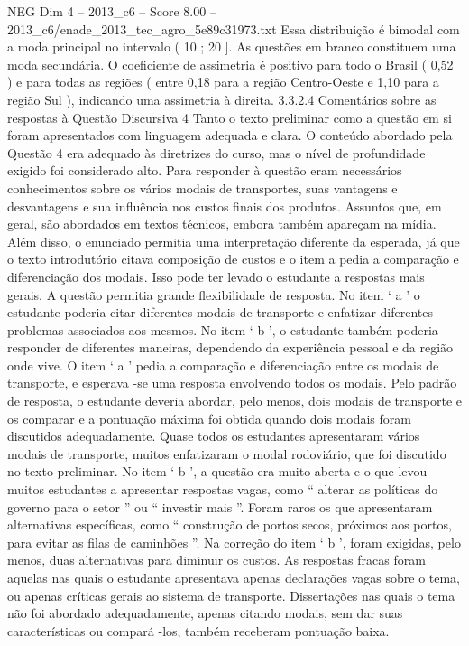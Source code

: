 \begin{textsample}{NEG Dim 4 – 2013\_c6 – Score 8.00 – 2013\_c6/enade\_2013\_tec\_agro\_5e89c31973.txt}
Essa distribuição é bimodal com a moda principal no intervalo ( 10 ; 20 ].
As questões em branco constituem uma moda secundária.
O coeficiente de assimetria é positivo para todo o Brasil ( 0,52 ) e para todas as regiões ( entre 0,18 para a região Centro-Oeste e 1,10 para a região Sul ), indicando uma assimetria à direita. 3.3.2.4 Comentários sobre as respostas à Questão Discursiva 4 Tanto o texto preliminar como a questão em si foram apresentados com linguagem adequada e clara.
O conteúdo abordado pela Questão 4 era adequado às diretrizes do curso, mas o nível de profundidade exigido foi considerado alto.
Para responder à questão eram necessários conhecimentos sobre os vários modais de transportes, suas vantagens e desvantagens e sua influência nos custos finais dos produtos.
Assuntos que, em geral, são abordados em textos técnicos, embora também apareçam na mídia.
Além disso, o enunciado permitia uma interpretação diferente da esperada, já que o texto introdutório citava composição de custos e o item a pedia a comparação e diferenciação dos modais.
Isso pode ter levado o estudante a respostas mais gerais.
A questão permitia grande flexibilidade de resposta.
No item ‘ a ’ o estudante poderia citar diferentes modais de transporte e enfatizar diferentes problemas associados aos mesmos.
No item ‘ b ’, o estudante também poderia responder de diferentes maneiras, dependendo da experiência pessoal e da região onde vive.
O item ‘ a ’ pedia a comparação e diferenciação entre os modais de transporte, e esperava -se uma resposta envolvendo todos os modais.
Pelo padrão de resposta, o estudante deveria abordar, pelo menos, dois modais de transporte e os comparar e a pontuação máxima foi obtida quando dois modais foram discutidos adequadamente.
Quase todos os estudantes apresentaram vários modais de transporte, muitos enfatizaram o modal rodoviário, que foi discutido no texto preliminar.
No item ‘ b ’, a questão era muito aberta e o que levou muitos estudantes a apresentar respostas vagas, como “ alterar as políticas do governo para o setor ” ou “ investir mais ”.
Foram raros os que apresentaram alternativas específicas, como “ construção de portos secos, próximos aos portos, para evitar as filas de caminhões ”.
Na correção do item ‘ b ’, foram exigidas, pelo menos, duas alternativas para diminuir os custos.
As respostas fracas foram aquelas nas quais o estudante apresentava apenas declarações vagas sobre o tema, ou apenas críticas gerais ao sistema de transporte.
Dissertações nas quais o tema não foi abordado adequadamente, apenas citando modais, sem dar suas características ou compará -los, também receberam pontuação baixa.

\end{textsample}
